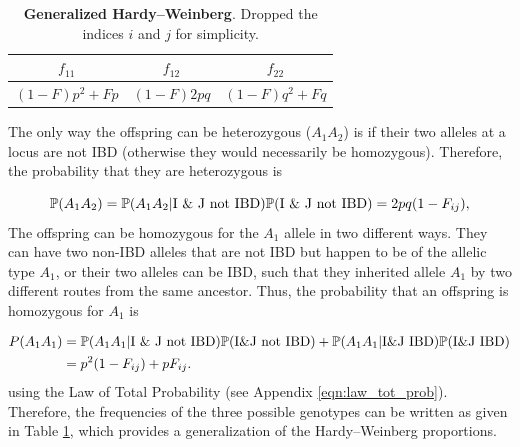{{\begin{table}
\begin{center}
\begin{tabular}{ccc}
\hline
$f_{11}$ & $f_{12}$ & $f_{22}$ \\
\hline
$(1-F) p^2 + F p$ & $(1-F) 2pq$ & $(1-F) q^2 + F q$ \\
\hline
\end{tabular}
\end{center}
\caption{\textbf{Generalized Hardy--Weinberg}.  Dropped the indices $i$ and $j$ for simplicity. } \label{table:GeneralizedHWE}
\end{table}

The only way the offspring can be heterozygous ($A_1 A_2$) is if their two
alleles at a locus are not IBD (otherwise they would necessarily be
homozygous). Therefore, the probability that they are heterozygous is

\begin{equation}
\P(A_1 A_2) = \P(A_1 A_2 |\textrm{I \& J not IBD} ) \P (\textrm{I \& J not IBD} ) = 2p q (1-F_{ij}) ,
\label{eq:hetGenHW}
\end{equation}
%
 The offspring
can be homozygous for the $A_1$ allele in two different ways.  They can have
two non-IBD alleles that are not IBD but happen to be of the allelic type
$A_1$, or their two alleles can be IBD, such that they inherited allele $A_1$
by two different routes from the same ancestor. Thus, the probability that an
offspring is homozygous for $A_1$ is

\begin{align}
P(A_1 A_1) & = \P(A_1 A_1 |\textrm{I \& J not IBD} ) \P (\textrm{I\&J
  not IBD} ) + \P(A_1 A_1 |\textrm{I\&J IBD} ) \P (\textrm{I\&J IBD}) \nonumber\\
             &= p^2(1-F_{ij})  + pF_{ij}.
\end{align}
%
using the Law of Total Probability (see Appendix
\eqn \eqref{eqn:law_tot_prob}).  Therefore, the frequencies of the three possible genotypes can be written as given in
Table \ref{table:GeneralizedHWE}, which provides a generalization of the Hardy--Weinberg
proportions.\\



}}
